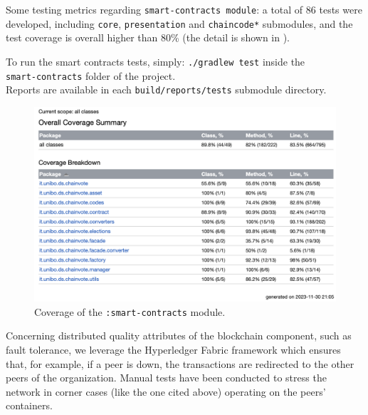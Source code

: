 \documentclass{scrartcl}
\begin{document}


Some testing metrics regarding \texttt{smart-contracts module}: a total of 86 tests were developed, including \texttt{core}, \texttt{presentation} and \texttt{chaincode*} submodules, and the test coverage is overall higher than 80\% (the detail is shown in ).

\begin{info}
    To run the smart contracts tests, simply: \texttt{./gradlew test} inside the \\ \texttt{smart-contracts} folder of the project.
    \\
    Reports are available in each \texttt{build/reports/tests} submodule directory.
\end{info}

\begin{figure}
    \centering
    \includegraphics[width=\linewidth]{figures/smart-contracts-coverage.png}
    \caption{Coverage of the \texttt{:smart-contracts} module.}
    \label{fig:smart-contracts-coverage} 
\end{figure}

Concerning distributed quality attributes of the blockchain component, such as fault tolerance, we leverage the Hyperledger Fabric framework which ensures that, for example, if a peer is down, the transactions are redirected to the other peers of the organization.
%
Manual tests have been conducted to stress the network in corner cases (like the one cited above) operating on the peers' containers.
\end{document}
